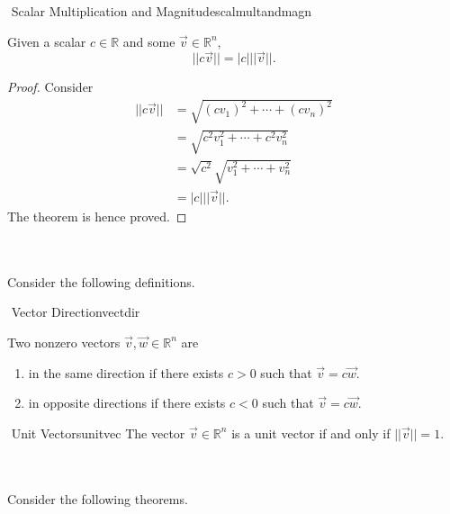     \begin{theorem}{\Stop\,\,Scalar Multiplication and Magnitude}{scalmultandmagn}

        Given a scalar \(c\in\mathbb{R}\) and some \(\vec{v}\in\mathbb{R}^n\), 
        \begin{equation*}
            ||c\vec{v}||=|c|||\vec{v}||.
        \end{equation*}
        \begin{proof}
        Consider
        \begin{align*}
            ||c\vec{v}||&=\sqrt{(cv_1)^2+\cdots+(cv_n)^2} \\
            &=\sqrt{c^2v_1^2+\cdots+c^2v_n^2} \\
            &=\sqrt{c^2}\sqrt{v_1^2+\cdots+v_n^2} \\
            &=|c|||\vec{v}||.
        \end{align*}    
        The theorem is hence proved.
        \end{proof}
            
    \end{theorem}
    \pagebreak
    \vphantom
    \\
    \\
    Consider the following definitions.
    \begin{definition}{\Stop\,\,Vector Direction}{vectdir}

        Two nonzero vectors \(\vec{v},\vec{w}\in\mathbb{R}^n\) are
        \begin{enumerate}
            \item in the same direction if there exists \(c>0\) such that \(\vec{v}=c\vec{w}\).
            \item in opposite directions if there exists \(c<0\) such that \(\vec{v}=c\vec{w}\).
        \end{enumerate}
        
    \end{definition}
    \begin{definition}{\Stop\,\,Unit Vectors}{unitvec}
        The vector \(\vec{v}\in\mathbb{R}^n\) is a unit vector if and only if \(||\vec{v}||=1\).
    \end{definition}
    \vphantom
    \\
    \\
    Consider the following theorems.
